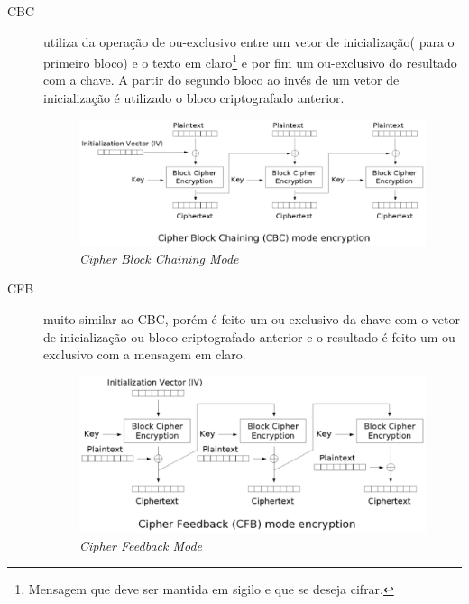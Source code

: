 \begin{description}
\begin{figure}[h]
\end{figure} 
\item[CBC] utiliza da operação de ou-exclusivo entre um vetor de inicialização( para o primeiro bloco) e o texto em claro\footnote{Mensagem que deve ser mantida em sigilo e que se deseja cifrar.} e por fim um ou-exclusivo do resultado com a chave. A partir do segundo bloco ao invés de um vetor de inicialização é utilizado o bloco criptografado anterior.
\begin{figure}[h]
\centering
\includegraphics[keepaspectratio=true,scale=0.7]
    {figuras/cbc.eps}
    \caption[Cipher Block Chaining Mode]{\textit{Cipher Block Chaining Mode}\protect\footnotemark}
\end{figure} 
\item[CFB] muito similar ao CBC, porém é feito um ou-exclusivo da chave com o vetor de inicialização ou bloco criptografado anterior e o resultado é feito um ou-exclusivo com a mensagem em claro.
\begin{figure}[h]
\centering
\includegraphics[keepaspectratio=true,scale=0.7]
    {figuras/cfb.eps}
    \caption[Cipher Feedback Mode]{\textit{Cipher Feedback Mode } \protect\footnotemark} 
\end{figure}

\end{description}
